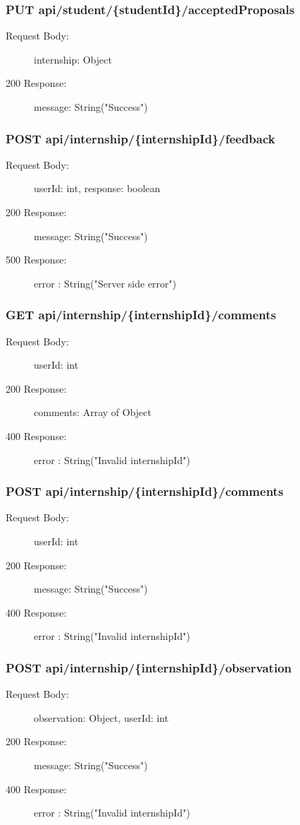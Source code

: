 \documentclass[a4paper,12pt]{article}
\begin{document}
\subsubsection*{PUT api/student/\{studentId\}/acceptedProposals}
\begin{description}
    \item[Request Body:] internship: Object
    \item[200 Response:] message: String("Success")
\end{description}

\subsubsection*{POST api/internship/\{internshipId\}/feedback}
\begin{description}
    \item[Request Body:] userId: int, response: boolean
    \item[200 Response:] message: String("Success") 
    \item[500 Response:] error : String("Server side error")
\end{description}

\subsubsection*{GET api/internship/\{internshipId\}/comments}
\begin{description}
    \item[Request Body:]  userId: int
    \item[200 Response:] comments: Array of Object 
    \item[400 Response:] error : String("Invalid internshipId")
\end{description}

\subsubsection*{POST api/internship/\{internshipId\}/comments}
\begin{description}
    \item[Request Body:]  userId: int
    \item[200 Response:] message: String("Success") 
    \item[400 Response:] error : String("Invalid internshipId")
\end{description}

\subsubsection*{POST api/internship/\{internshipId\}/observation}
\begin{description}
    \item[Request Body:] observation: Object, userId: int
    \item[200 Response:] message: String("Success") 
    \item[400 Response:] error : String("Invalid internshipId")
\end{description}
\end{document}
